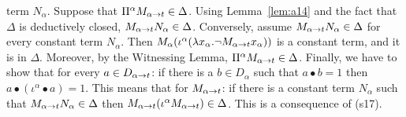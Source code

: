 term $N_{\alpha}$. Suppose that $\Pi^{\alpha}M_{\alpha\rightarrow t} \in
\Delta$. Using Lemma~\ref{lem:a14} and the fact that $\Delta$ is
deductively closed, $M_{\alpha\rightarrow t}N_{\alpha} \in \Delta$.
Conversely, assume $M_{\alpha\rightarrow t}N_{\alpha} \in \Delta$ for
every constant term $N_{\alpha}$. Then
$M_{\alpha}(\iota^{\alpha}(\lambda x_{\alpha}.\neg M_{\alpha\rightarrow
t}x_{\alpha}))$ is a constant term, and it is in $\Delta$.
Moreover, by the Witnessing Lemma, $\Pi^{\alpha}M_{\alpha\rightarrow t}
\in \Delta$. Finally, we have to show that for every $a \in
D_{\alpha\rightarrow t}$: if there is a $b \in D_{\alpha}$ such that $a
\bullet b = 1$ then $a \bullet (\iota^{\alpha} \bullet a) = 1$. 
This means that for $M_{\alpha\rightarrow t}$: if there
is a constant term $N_{\alpha}$ such that $M_{\alpha\rightarrow
t}N_{\alpha} \in \Delta$ then $M_{\alpha\rightarrow
t}(\iota^{\alpha}M_{\alpha\rightarrow t}) \in \Delta$.
This is a consequence of (s17). %
\newline\mbox{}
\proofend

